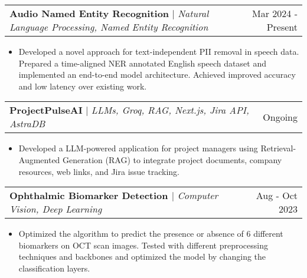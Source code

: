 \documentclass[letterpaper,11pt]{article}
\makeatletter
\newcommand{\resumeItem}[1]{
  \item\small{
    {#1 \vspace{-2pt}}
  }
}
\newcommand{\resumeProjectHeading}[2]{
    \item
    \begin{tabular*}{0.97\textwidth}{l@{\extracolsep{\fill}}r}
      \small#1 & #2 \\
    \end{tabular*}\vspace{-7pt}
}
\newcommand{\resumeItemListStart}{\begin{itemize}}
\newcommand{\resumeItemListEnd}{\end{itemize}\vspace{-5pt}}
\makeatother
\begin{document}
        \resumeProjectHeading
        {\textbf{Audio Named Entity Recognition} $|$ \footnotesize\emph {Natural Language Processing, Named Entity Recognition}}{Mar 2024 - Present}
        \resumeItemListStart
            \vspace{2pt}
            \resumeItem{Developed a novel approach for text-independent PII removal in speech data. Prepared a time-aligned NER annotated English speech dataset and implemented an end-to-end model architecture. Achieved improved accuracy and low latency over existing work.}
            \vspace{2pt}
        \resumeItemListEnd

        \resumeProjectHeading
        {\textbf{ProjectPulseAI }{\href{https://github.com/SasiniWanigathunga/ProjectPulseAI.git}{\faIcon{external-link-square-alt}}} $|$ \footnotesize\emph{LLMs, Groq, RAG, Next.js, Jira API, AstraDB}}{Ongoing}
        \resumeItemListStart
            \vspace{2pt}
            \resumeItem{Developed a LLM-powered application for project managers using Retrieval-Augmented Generation (RAG) to integrate project documents, company resources, web links, and Jira issue tracking.}
        \resumeItemListEnd
   
        \resumeProjectHeading
        {\textbf{Ophthalmic Biomarker Detection {\href{https://github.com/SasiniWanigathunga/VIP-Cup-2023.git}{\faIcon{external-link-square-alt}}}} $|$ \footnotesize\emph{Computer Vision, Deep Learning}}{Aug - Oct 2023}
        \resumeItemListStart
            \vspace{2pt}
            \resumeItem{Optimized the algorithm to predict the presence or absence of 6 different biomarkers on OCT scan images. Tested with different preprocessing techniques and backbones and optimized the model by changing the classification layers.}
        \resumeItemListEnd
\end{document}
